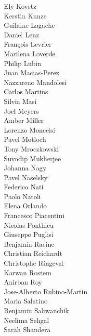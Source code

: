 \documentclass[PICOReport.tex]{subfiles}
\begin{document}
{\begin{multicols}{4}
Ely Kovetz                      \\
Kerstin Kunze                   \\
Guilaine Lagache                \\
Daniel Lenz                     \\
Fran\c{c}ois Levrier            \\
Marilena Loverde                \\
Philip Lubin                    \\
Juan Macias-Perez               \\
Nazzareno Mandolesi             \\
Carlos Martins                  \\
Silvia Masi                     \\
Joel Meyers                     \\
Amber Miller                    \\
Lorenzo Moncelsi                \\
Pavel Motloch                   \\
Tony Mroczkowski                \\
Suvodip Mukherjee               \\
Johanna Nagy                    \\
Pavel Naselsky                  \\
Federico Nati                   \\
Paolo Natoli                    \\
Elena Orlando                   \\
Francesco Piacentini            \\
Nicolas Ponthieu                \\
Giuseppe Puglisi                \\
Benjamin Racine                 \\
Christian Reichardt             \\
Christophe Ringeval             \\
Karwan Rostem                   \\
Anirban Roy                     \\
Jose-Alberto Rubino-Martin      \\
Maria Salatino                  \\
Benjamin Saliwanchik            \\
Neelima Sehgal                  \\
Sarah Shandera                  \\

\end{multicols}}
\end{document}
